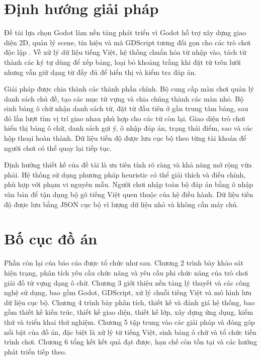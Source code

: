 \documentclass[../DoAn.tex]{subfiles}
\begin{document}
\section{Định hướng giải pháp}
\label{section:1.3}
Đề tài lựa chọn Godot làm nền tảng phát triển vì Godot hỗ trợ xây dựng giao diện 2D, quản lý scene, tín hiệu và mã GDScript tương đối gọn cho các trò chơi độc lập \cite{godotDocs}. Về xử lý dữ liệu tiếng Việt, hệ thống chuẩn hóa từ nhập vào, tách từ thành các ký tự dùng để xếp bảng, loại bỏ khoảng trắng khi đặt từ trên lưới nhưng vẫn giữ dạng từ đầy đủ để hiển thị và kiểm tra đáp án.

Giải pháp được chia thành các thành phần chính. Bộ cung cấp màn chơi quản lý danh sách chủ đề, tạo các mục từ vựng và chia chúng thành các màn nhỏ. Bộ sinh bảng ô chữ nhận danh sách từ, đặt từ đầu tiên ở gần trung tâm bảng, sau đó lần lượt tìm vị trí giao nhau phù hợp cho các từ còn lại. Giao diện trò chơi hiển thị bảng ô chữ, danh sách gợi ý, ô nhập đáp án, trạng thái điểm, sao và các hộp thoại hoàn thành. Dữ liệu tiến độ được lưu cục bộ theo từng tài khoản để người chơi có thể quay lại tiếp tục.

Định hướng thiết kế của đề tài là ưu tiên tính rõ ràng và khả năng mở rộng vừa phải. Hệ thống sử dụng phương pháp heuristic có thể giải thích và điều chỉnh, phù hợp với phạm vi nguyên mẫu. Người chơi nhập toàn bộ đáp án bằng ô nhập văn bản để tận dụng bộ gõ tiếng Việt quen thuộc của hệ điều hành. Dữ liệu tiến độ được lưu bằng JSON cục bộ vì lượng dữ liệu nhỏ và không cần máy chủ.

\section{Bố cục đồ án}
\label{section:1.4}
Phần còn lại của báo cáo được tổ chức như sau. Chương 2 trình bày khảo sát hiện trạng, phân tích yêu cầu chức năng và yêu cầu phi chức năng của trò chơi giải đố từ vựng dạng ô chữ. Chương 3 giới thiệu nền tảng lý thuyết và các công nghệ sử dụng, bao gồm Godot, GDScript, xử lý chuỗi tiếng Việt và mô hình lưu dữ liệu cục bộ. Chương 4 trình bày phân tích, thiết kế và đánh giá hệ thống, bao gồm thiết kế kiến trúc, thiết kế giao diện, thiết kế lớp, xây dựng ứng dụng, kiểm thử và triển khai thử nghiệm. Chương 5 tập trung vào các giải pháp và đóng góp nổi bật của đồ án, đặc biệt là xử lý từ tiếng Việt, sinh bảng ô chữ và tổ chức tiến trình chơi. Chương 6 tổng kết kết quả đạt được, hạn chế còn tồn tại và các hướng phát triển tiếp theo.
\end{document}
